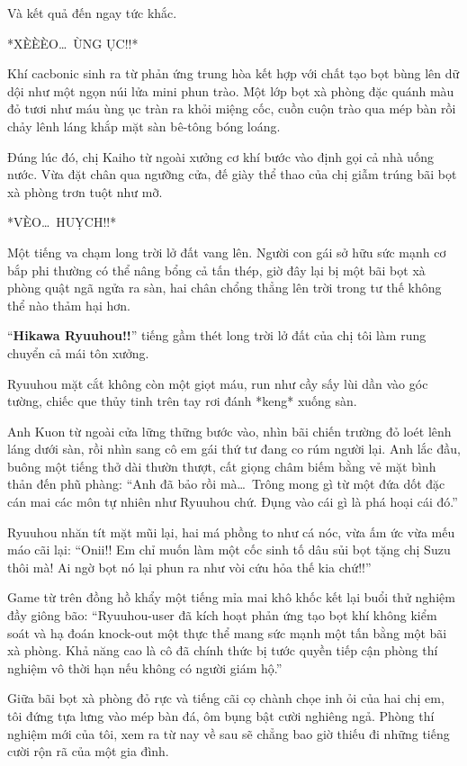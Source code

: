 \documentclass[../main.tex]{subfiles}
\begin{document}
Và kết quả đến ngay tức khắc.

*XÈÈÈO\dots\ ÙNG ỤC!!*

Khí cacbonic sinh ra từ phản ứng trung hòa kết hợp với chất tạo bọt bùng lên dữ dội như một ngọn núi lửa mini phun trào. Một lớp bọt xà phòng đặc quánh màu đỏ tươi như máu ùng ục tràn ra khỏi miệng cốc, cuồn cuộn trào qua mép bàn rồi chảy lênh láng khắp mặt sàn bê-tông bóng loáng.

Đúng lúc đó, chị Kaiho từ ngoài xưởng cơ khí bước vào định gọi cả nhà uống nước. Vừa đặt chân qua ngưỡng cửa, đế giày thể thao của chị giẫm trúng bãi bọt xà phòng trơn tuột như mỡ.

*VÈO\dots\ HUỴCH!!*

Một tiếng va chạm long trời lở đất vang lên. Người con gái sở hữu sức mạnh cơ bắp phi thường có thể nâng bổng cả tấn thép, giờ đây lại bị một bãi bọt xà phòng quật ngã ngửa ra sàn, hai chân chổng thẳng lên trời trong tư thế không thể nào thảm hại hơn.

``\textbf{Hikawa Ryuuhou!!}'' tiếng gầm thét long trời lở đất của chị tôi làm rung chuyển cả mái tôn xưởng.

Ryuuhou mặt cắt không còn một giọt máu, run như cầy sấy lùi dần vào góc tường, chiếc que thủy tinh trên tay rơi đánh *keng* xuống sàn.

Anh Kuon từ ngoài cửa lững thững bước vào, nhìn bãi chiến trường đỏ loét lênh láng dưới sàn, rồi nhìn sang cô em gái thứ tư đang co rúm người lại. Anh lắc đầu, buông một tiếng thở dài thườn thượt, cất giọng châm biếm bằng vẻ mặt bình thản đến phũ phàng: ``Anh đã bảo rồi mà\dots\ Trông mong gì từ một đứa dốt đặc cán mai các môn tự nhiên như Ryuuhou chứ. Đụng vào cái gì là phá hoại cái đó.''

Ryuuhou nhăn tít mặt mũi lại, hai má phồng to như cá nóc, vừa ấm ức vừa mếu máo cãi lại: ``Onii!! Em chỉ muốn làm một cốc sinh tố dâu sủi bọt tặng chị Suzu thôi mà! Ai ngờ bọt nó lại phun ra như vòi cứu hỏa thế kia chứ!!''

Game từ trên đồng hồ khẩy một tiếng mỉa mai khô khốc kết lại buổi thử nghiệm đầy giông bão: ``Ryuuhou-user đã kích hoạt phản ứng tạo bọt khí không kiểm soát và hạ đoán knock-out một thực thể mang sức mạnh một tấn bằng một bãi xà phòng. Khả năng cao là cô đã chính thức bị tước quyền tiếp cận phòng thí nghiệm vô thời hạn nếu không có người giám hộ.''

Giữa bãi bọt xà phòng đỏ rực và tiếng cãi cọ chành chọe inh ỏi của hai chị em, tôi đứng tựa lưng vào mép bàn đá, ôm bụng bật cười nghiêng ngả. Phòng thí nghiệm mới của tôi, xem ra từ nay về sau sẽ chẳng bao giờ thiếu đi những tiếng cười rộn rã của một gia đình.
\end{document}
